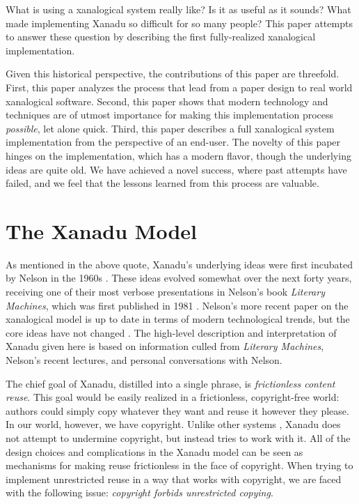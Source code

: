 \documentclass{acm_proc_article-sp}
\begin{document}
What is using a xanalogical system really like?
Is it as useful as it sounds?
What made implementing Xanadu so difficult for so many people?  
This paper attempts to answer these question by describing the first fully-realized xanalogical implementation.

Given this historical perspective, the contributions of this paper are threefold.
First, this paper analyzes the process that lead from a paper design to real world xanalogical software.
Second, this paper shows that modern technology and techniques are of utmost importance for making this implementation process {\it possible}, let alone quick.
Third, this paper describes a full xanalogical system implementation from the perspective of an end-user.
The novelty of this paper hinges on the implementation, which has a modern flavor, though the underlying ideas are quite old.
We have achieved a novel success, where past attempts have failed, and we feel that the lessons learned from this process are valuable.




\section{The Xanadu Model}

\label{sec:Xanadu}
As mentioned in the above quote, Xanadu's underlying ideas were first incubated by Nelson in the 1960s \cite{Nelson1965}.  
These ideas evolved somewhat over the next forty years, receiving one of their most verbose presentations in Nelson's book {\it Literary Machines}, which was first published in 1981 \cite{NelsonLiteraryMachines}.  
Nelson's more recent paper on the xanalogical model is up to date in terms of modern technological trends, but the core ideas have not changed \cite{Nelson1999}.  
The high-level description and interpretation of Xanadu given here is based on information culled from {\it Literary Machines}, Nelson's recent lectures, and personal conversations with Nelson.

The chief goal of Xanadu, distilled into a single phrase, is {\it frictionless content reuse}.  
This goal would be easily realized in a frictionless, copyright-free world:  authors could simply copy whatever they want and reuse it however they please.  
In our world, however, we have copyright.
Unlike other systems \cite{Clark2000}, Xanadu does not attempt to undermine copyright, but instead tries to work with it. 
All of the design choices and complications in the Xanadu model can be seen as mechanisms for making reuse frictionless in the face of copyright.
When trying to implement unrestricted reuse in a way that works with copyright, we are faced with the following issue:  {\it copyright forbids unrestricted copying}.
\end{document}
